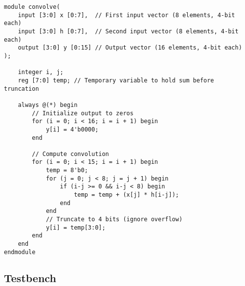\documentclass{article}
\begin{document}
\begin{lstlisting}
module convolve(
    input [3:0] x [0:7],  // First input vector (8 elements, 4-bit each)
    input [3:0] h [0:7],  // Second input vector (8 elements, 4-bit each)
    output [3:0] y [0:15] // Output vector (16 elements, 4-bit each)
);

    integer i, j;
    reg [7:0] temp; // Temporary variable to hold sum before truncation
    
    always @(*) begin
        // Initialize output to zeros
        for (i = 0; i < 16; i = i + 1) begin
            y[i] = 4'b0000;
        end
        
        // Compute convolution
        for (i = 0; i < 15; i = i + 1) begin
            temp = 8'b0;
            for (j = 0; j < 8; j = j + 1) begin
                if (i-j >= 0 && i-j < 8) begin
                    temp = temp + (x[j] * h[i-j]);
                end
            end
            // Truncate to 4 bits (ignore overflow)
            y[i] = temp[3:0];
        end
    end
endmodule
\end{lstlisting}

\subsection{Testbench}
\end{document}
